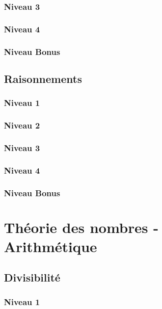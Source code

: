 \documentclass[a4paper]{report}
\begin{document}
			\subsection{Niveau 3}
			
			\subsection{Niveau 4}
			
			\subsection{Niveau Bonus}
		
		\section{Raisonnements}
		
			\subsection{Niveau 1}
		
			\subsection{Niveau 2}
		
			\subsection{Niveau 3}
			
			\subsection{Niveau 4}
			
			\subsection{Niveau Bonus}
	
	\chapter{Théorie des nombres - Arithmétique}
	
		\section{Divisibilité}
		
			\subsection{Niveau 1}
		
\end{document}
